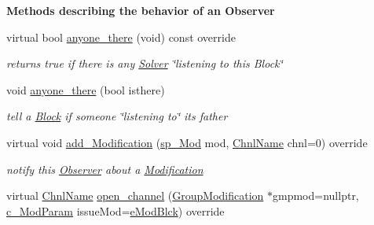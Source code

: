 \begin{Indent}\textbf{ Methods describing the behavior of an Observer}\par
\begin{DoxyCompactItemize}
\item 
virtual bool \mbox{\hyperlink{class_s_m_spp__di__unipi__it_1_1_block_ab59584c81cf3770593fcf1b6371bafff}{anyone\+\_\+there}} (void) const override
\begin{DoxyCompactList}\small\item\em returns true if there is any \mbox{\hyperlink{class_s_m_spp__di__unipi__it_1_1_solver}{Solver}} \char`\"{}listening to this Block\char`\"{} \end{DoxyCompactList}\item 
void \mbox{\hyperlink{class_s_m_spp__di__unipi__it_1_1_block_a6aa89187efc49648bd2c01f30a27a81f}{anyone\+\_\+there}} (bool isthere)
\begin{DoxyCompactList}\small\item\em tell a \mbox{\hyperlink{class_s_m_spp__di__unipi__it_1_1_block}{Block}} if someone \char`\"{}listening to\char`\"{} its father \end{DoxyCompactList}\item 
virtual void \mbox{\hyperlink{class_s_m_spp__di__unipi__it_1_1_block_a9b94536a10555dfb680e015fcb4787a8}{add\+\_\+\+Modification}} (\mbox{\hyperlink{group___modification___t_y_p_e_s_ga9024cf2ead61a1280d29771b063b1a62}{sp\+\_\+\+Mod}} mod, \mbox{\hyperlink{class_s_m_spp__di__unipi__it_1_1_observer_a54ce8db639626e45b1f20c289baa989b}{Chnl\+Name}} chnl=0) override
\begin{DoxyCompactList}\small\item\em notify this \mbox{\hyperlink{class_s_m_spp__di__unipi__it_1_1_observer}{Observer}} about a \mbox{\hyperlink{class_s_m_spp__di__unipi__it_1_1_modification}{Modification}} \end{DoxyCompactList}\item 
virtual \mbox{\hyperlink{class_s_m_spp__di__unipi__it_1_1_observer_a54ce8db639626e45b1f20c289baa989b}{Chnl\+Name}} \mbox{\hyperlink{class_s_m_spp__di__unipi__it_1_1_block_a6459343d63aec3d39ece1e20467db47b}{open\+\_\+channel}} (\mbox{\hyperlink{class_s_m_spp__di__unipi__it_1_1_group_modification}{Group\+Modification}} $\ast$gmpmod=nullptr, \mbox{\hyperlink{group___modification___t_y_p_e_s_ga544246d8c462e9a2d817c2c30797968f}{c\+\_\+\+Mod\+Param}} issue\+Mod=\mbox{\hyperlink{group___modification___t_y_p_e_s_gga48fddcdd03a03f49b7e389ca1ed938d4a21b14b26b1c0093a0905f6fc010bad29}{e\+Mod\+Blck}}) override

\end{DoxyCompactItemize}
\end{Indent}
